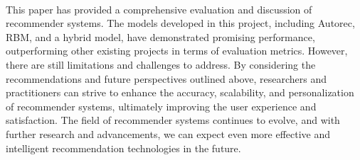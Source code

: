 \documentclass{cup-pan}
\begin{document}
\paragraph{}
This paper has provided a comprehensive evaluation and discussion of recommender systems. The models developed in this project, including Autorec, RBM, and a hybrid model, have demonstrated promising performance, outperforming other existing projects in terms of evaluation metrics. However, there are still limitations and challenges to address. By considering the recommendations and future perspectives outlined above, researchers and practitioners can strive to enhance the accuracy, scalability, and personalization of recommender systems, ultimately improving the user experience and satisfaction. The field of recommender systems continues to evolve, and with further research and advancements, we can expect even more effective and intelligent recommendation technologies in the future.
\\\\
\end{document}

